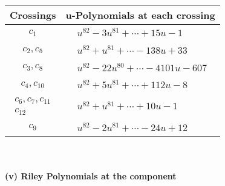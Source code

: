\documentclass[1p]{elsarticle_modified}
\theoremstyle{definition}
\begin{document}
\begin{tabular}{m{50pt}|m{274pt}}
Crossings & \hspace{64pt}u-Polynomials at each crossing \\
\hline $$\begin{aligned}c_{1}\end{aligned}$$&$\begin{aligned}
&u^{82}-3 u^{81}+\cdots+15 u-1
\end{aligned}$\\
\hline $$\begin{aligned}c_{2},c_{5}\end{aligned}$$&$\begin{aligned}
&u^{82}+u^{81}+\cdots-138 u+33
\end{aligned}$\\
\hline $$\begin{aligned}c_{3},c_{8}\end{aligned}$$&$\begin{aligned}
&u^{82}-22 u^{80}+\cdots-4101 u-607
\end{aligned}$\\
\hline $$\begin{aligned}c_{4},c_{10}\end{aligned}$$&$\begin{aligned}
&u^{82}+5 u^{81}+\cdots+112 u-8
\end{aligned}$\\
\hline $$\begin{aligned}c_{6},c_{7},c_{11}\\c_{12}\end{aligned}$$&$\begin{aligned}
&u^{82}+u^{81}+\cdots+10 u-1
\end{aligned}$\\
\hline $$\begin{aligned}c_{9}\end{aligned}$$&$\begin{aligned}
&u^{82}-2 u^{81}+\cdots-24 u+12
\end{aligned}$\\
\hline
\end{tabular}\\~\\
\newpage\renewcommand{\arraystretch}{1}
\flushleft \textbf{(v) Riley Polynomials at the component}\newline \\
\end{document}

